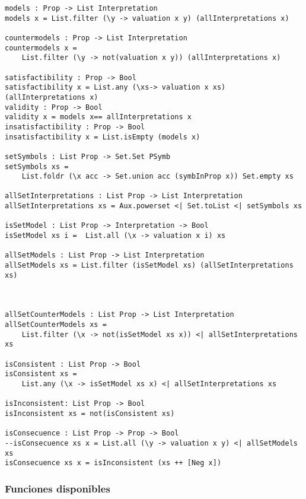 \documentclass[a4paper]{report}
\begin{document}
\begin{lstlisting}[caption={Módulo SintaxSemanticsLP}]
models : Prop -> List Interpretation
models x = List.filter (\y -> valuation x y) (allInterpretations x)

countermodels : Prop -> List Interpretation
countermodels x =
    List.filter (\y -> not(valuation x y)) (allInterpretations x)

satisfactibility : Prop -> Bool
satisfactibility x = List.any (\xs-> valuation x xs) (allInterpretations x)
validity : Prop -> Bool
validity x = models x== allInterpretations x
insatisfactibility : Prop -> Bool
insatisfactibility x = List.isEmpty (models x)

setSymbols : List Prop -> Set.Set PSymb
setSymbols xs = 
    List.foldr (\x acc -> Set.union acc (symbInProp x)) Set.empty xs

allSetInterpretations : List Prop -> List Interpretation
allSetInterpretations xs = Aux.powerset <| Set.toList <| setSymbols xs

isSetModel : List Prop -> Interpretation -> Bool
isSetModel xs i =  List.all (\x -> valuation x i) xs

allSetModels : List Prop -> List Interpretation
allSetModels xs = List.filter (isSetModel xs) (allSetInterpretations xs)



allSetCounterModels : List Prop -> List Interpretation
allSetCounterModels xs = 
    List.filter (\x -> not(isSetModel xs x)) <| allSetInterpretations xs

isConsistent : List Prop -> Bool
isConsistent xs = 
    List.any (\x -> isSetModel xs x) <| allSetInterpretations xs

isInconsistent: List Prop -> Bool
isInconsistent xs = not(isConsistent xs)

isConsecuence : List Prop -> Prop -> Bool
--isConsecuence xs x = List.all (\y -> valuation x y) <| allSetModels xs
isConsecuence xs x = isInconsistent (xs ++ [Neg x])
\end{lstlisting}


\subsubsection{Funciones disponibles}
\end{document}
